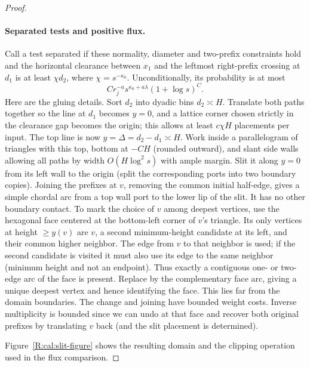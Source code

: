 \begin{proof}
\paragraph{Separated tests and positive flux.}
Call a test separated if these normality, diameter and two-prefix constraints hold and the horizontal clearance between \(x_1\) and the leftmost right-prefix crossing at \(d_1\) is at least \(\chi d_2\), where \(\chi=s^{-\kappa_0}\). Unconditionally, its probability is at most
\begin{equation}
 C r_j^{-a}s^{\kappa_0+a\lambda}(1+\log s)^C.                               \label{R:cal:separated-test}
\end{equation}
Here are the gluing details. Sort \(d_2\) into dyadic bins \(d_2\asymp H\). Translate both paths together so the line at \(d_1\) becomes \(y=0\), and a lattice corner chosen strictly in the clearance gap becomes the origin; this allows at least \(c\chi H\) placements per input. The top line is now \(y=\Delta=d_2-d_1\asymp H\). Work inside a parallelogram of triangles with this top, bottom at \(-C H\) (rounded outward), and slant side walls allowing all paths by width \(O(H\log^2 s)\) with ample margin. Slit it along \(y=0\) from its left wall to the origin (split the corresponding ports into two boundary copies). Joining the prefixes at \(v\), removing the common initial half-edge, gives a simple chordal arc from a top wall port to the lower lip of the slit. It has no other boundary contact. To mark the choice of \(v\) among deepest vertices, use the hexagonal face centered at the bottom-left corner of \(v\)'s triangle. Its only vertices at height \(\ge y(v)\) are \(v\), a second minimum-height candidate at its left, and their common higher neighbor. The edge from \(v\) to that neighbor is used; if the second candidate is visited it must also use its edge to the same neighbor (minimum height and not an endpoint). Thus exactly a contiguous one- or two-edge arc of the face is present. Replace by the complementary face arc, giving a unique deepest vertex and hence identifying the face. This lies far from the domain boundaries. The change and joining have bounded weight costs. Inverse multiplicity is bounded since we can undo at that face and recover both original prefixes by translating \(v\) back (and the slit placement is determined).

Figure~\ref{R:cal:slit-figure} shows the resulting domain and the clipping operation used in the flux comparison.


\end{proof}
